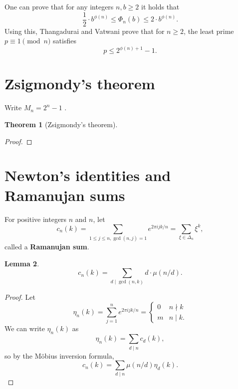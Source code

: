 \documentclass{amsart}
\newtheorem{theorem}{Theorem}
\newtheorem{lemma}[theorem]{Lemma}
\theoremstyle{definition}
\begin{document}
One can prove that for any integers $n,b \geq 2$ it holds that
\[
\frac{1}{2} \cdot b^{\phi(n)} \leq \Phi_n(b) \leq 2\cdot b^{\phi(n)}.
\]
Using this, Thangadurai and Vatwani \cite{thangadurai} prove that
for $n \geq 2$, the least prime $p \equiv 1 \pmod{n}$ satisfies
\[
p \leq 2^{\phi(n)+1}-1.
\]



\section{Zsigmondy's theorem}

Write $M_n=2^n-1$ \cite[pp.~167--169, \S 8.3.1]{everest}.

\begin{theorem}[Zsigmondy's theorem]

\end{theorem}
\begin{proof}

\end{proof}








\section{Newton's identities and Ramanujan sums}
For positive integers $n$ and $n$,
let
\[
c_n(k) = \sum_{1 \leq j \leq n, \gcd(n,j)=1} e^{2\pi ijk/n} = \sum_{\xi \in \Delta_n} \xi^k,
\]
called a \textbf{Ramanujan sum}.


\begin{lemma}
\[
c_n(k) = \sum_{d \mid \gcd(n,k)} d\cdot \mu(n/d).
\]
\label{ramanujanmobius}
\end{lemma}
\begin{proof}
Let
\[
\eta_n(k) = \sum_{j=1}^n e^{2\pi ijk/n} 
=\begin{cases}
0&n \nmid k\\
m&n \mid k.
\end{cases}
\]
We can write $\eta_n(k)$ as
\[
\eta_n(k) = \sum_{d \mid n} c_d(k),
\]
so by the M\"obius inversion formula, 
\[
c_n(k) = \sum_{d \mid n} \mu(n/d) \eta_d(k).
\]
\end{proof}
\end{document}
